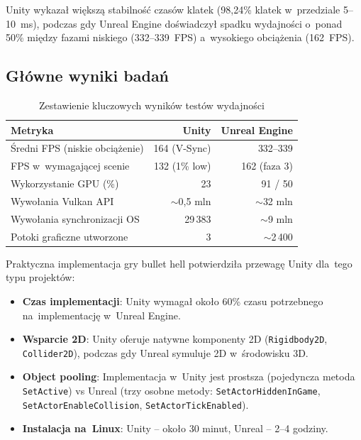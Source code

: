 Unity wykazał większą stabilność czasów klatek (98,24\% klatek w~przedziale 5--10~ms), podczas gdy Unreal Engine doświadczył spadku wydajności o~ponad 50\% między fazami niskiego (332--339~FPS) a~wysokiego obciążenia (162~FPS).

\subsection{Główne wyniki badań}


\begin{table}[H]
\centering
\caption{Zestawienie kluczowych wyników testów wydajności}
\label{tab:podsumowanie-wydajnosc}
\begin{tabular}{|l|r|r|}
\hline
\textbf{Metryka} & \textbf{Unity} & \textbf{Unreal Engine} \\
\hline
Średni FPS (niskie obciążenie) & 164 (V-Sync) & 332--339 \\
FPS w~wymagającej scenie & 132 (1\% low) & 162 (faza 3) \\
Wykorzystanie GPU (\%) & 23 & 91 / 50 \\
Wywołania Vulkan API & $\sim$0,5 mln & $\sim$32 mln \\
Wywołania synchronizacji OS & 29\,383 & $\sim$9 mln \\
Potoki graficzne utworzone & 3 & $\sim$2\,400 \\
\hline
\end{tabular}
\end{table}


Praktyczna implementacja gry bullet hell potwierdziła przewagę Unity dla~tego typu projektów:

\begin{itemize}
    \item \textbf{Czas implementacji}: Unity wymagał około 60\% czasu potrzebnego na~implementację w~Unreal Engine.
    \item \textbf{Wsparcie 2D}: Unity oferuje natywne komponenty 2D (\texttt{Rigidbody2D}, \texttt{Collider2D}), podczas gdy Unreal symuluje 2D w~środowisku 3D.
    \item \textbf{Object pooling}: Implementacja w~Unity jest prostsza
    (pojedyncza metoda \\ \texttt{SetActive}) vs Unreal (trzy osobne metody:
    \texttt{SetActorHiddenInGame}, 
    \\ \texttt{SetActorEnableCollision}, 
    \texttt{SetActorTickEnabled}).
    \item \textbf{Instalacja na~Linux}: Unity -- około 30 minut, Unreal -- 2--4 godziny.
\end{itemize}


